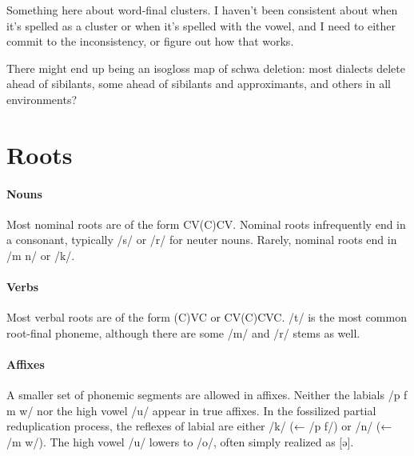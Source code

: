 \begin{kaobox}[frametitle=\sc todo:] 
Something here about word-final clusters. I haven't been consistent about when it's spelled as a cluster or when it's spelled with the vowel, and I need to either commit to the inconsistency, or figure out how that works.
\end{kaobox}

\begin{kaobox}[frametitle=\sc todo:] 
There might end up being an isogloss map of schwa deletion: most dialects delete ahead of sibilants, some ahead of sibilants and approximants, and others in all environments?
\end{kaobox}

\section{Roots}
\paragraph{Nouns}
Most nominal roots are of the form CV(C)CV. Nominal roots infrequently end in a consonant, typically /s/ or /r/ for neuter nouns. Rarely, nominal roots end in /m n/ or /k/.

\paragraph{Verbs}
Most verbal roots are of the form (C)VC or CV(C)CVC. /t/ is the most common root-final phoneme, although there are some /m/ and /r/ stems as well.

\paragraph{Affixes}
A smaller set of phonemic segments are allowed in affixes. Neither the labials /p f m w/ nor the high vowel /u/ appear in true affixes. In the fossilized partial reduplication process, the reflexes of labial are either /k/ (← /p f/) or /n/ (← /m w/). The high vowel /u/ lowers to /o/, often simply realized as [ə].

